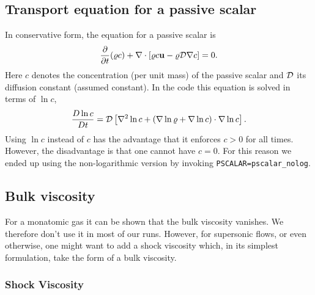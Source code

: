\documentclass[\mydriver,12pt,twoside,notitlepage,a4paper]{article}
\newcommand{\code}[1]{\texttt{#1}}
\newcommand{\grad}    {\nabla}
\newcommand{\Div}     {\nabla\cdot}
\newcommand{\Laplace} {\nabla^2}
\newcommand{\vekt}[1] {\mathbf{#1}}
\newcommand{\uv}            {\vekt{u}}
\begin{document}

\subsection{Transport equation for a passive scalar}

In conservative form, the equation for a passive scalar is
\begin{equation}
{\partial\over\partial t}(\varrho c)+
\Div\left[\varrho c\uv-\varrho{\cal D}\nabla c\right]=0.
\end{equation}
Here $c$ denotes the concentration (per unit mass) of the passive scalar and
${\cal D}$ its diffusion constant (assumed constant).
In the code this equation is solved in terms of $\ln c$,
\begin{equation}
  \frac{D\ln c}{Dt}
  = {\cal D} \left[ \Laplace\ln c + (\grad\ln\varrho+\grad\ln c)\cdot\grad\ln c
               \right].
\end{equation}
Using $\ln c$ instead of $c$ has the advantage that it enforces $c>0$ for all
times.
However, the disadvantage is that one cannot have $c=0$.
For this reason we ended up using the non-logarithmic version by
invoking \code{PSCALAR=pscalar_nolog}.


\subsection{Bulk viscosity}
\label{Bulkviscosity}

For a monatomic gas it can be shown that the bulk viscosity vanishes.
We therefore don't use it in most of our runs.
However, for supersonic flows, or even otherwise, one might want to add a
shock viscosity which, in its simplest formulation, take the form of a
bulk viscosity.

\subsubsection{Shock Viscosity}
\label{ShockViscosity}
\end{document}
